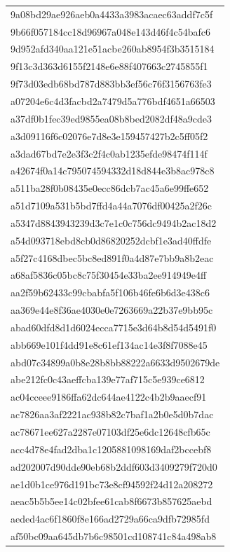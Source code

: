 \begin{tabular}{l}
9a08bd29ae926aeb0a4433a3983acaec63addf7c5f \\
9b66f057184cc18d96967a048e143d46f4c54bafc6 \\
9d952afd340aa121e51acbe260ab8954f3b3515184 \\
9f13c3d363d6155f2148e6e88f407663c2745855f1 \\
9f73d03edb68bd787d883bb3ef56c76f3156763fe3 \\
a07204e6c4d3facbd2a7479d5a776bdf4651a66503 \\
a37df0b1fec39ed9855ea08b8bed2082df48a9cde3 \\
a3d09116f6c02076e7d8e3e159457427b2c5ff05f2 \\
a3dad67bd7e2e3f3c2f4c0ab1235efde98474f114f \\
a42674f0a14c795074594332d18d844e3b8ac978c8 \\
a511ba28f0b08435e0ecc86dcb7ac45a6e99ffe652 \\
a51d7109a531b5bd7ffd4a44a7076df00425a2f26c \\
a5347d8843943239d3c7e1c0c756dc9494b2ac18d2 \\
a54d093718ebd8cb0d86820252dcbf1e3ad40ffdfe \\
a5f27c4168dbec5bc8ed891f0a4d87e7bb9a8b2eac \\
a68af5836c05bc8c75f30454e33ba2ee914949e4ff \\
aa2f59b62433c99cbabfa5f106b46fe6b6d3e438c6 \\
aa369e44e8f36ae4030e0e7263669a22b37e9bb95c \\
abad60dfd8d1d6024ecca7715e3d64b8d54d5491f0 \\
abb669e101f4dd91e8c61ef134ac14e3f8f7088e45 \\
abd07c34899a0b8e28b8bb88222a6633d9502679de \\
abe212fc0c43aeffcba139e77af715c5e939ce6812 \\
ac04cceee9186ffa62dc644ae4122c4b2b9aaecf91 \\
ac7826aa3af2221ac938b82c7baf1a2b0e5d0b7dac \\
ac78671ee627a2287e07103df25e6dc12648cfb65c \\
acc4d78e4fad2dba1c1205881098169daf2bccebf8 \\
ad202007d90dde90eb68b2ddf603d3409279f720d0 \\
ae1d0b1ce976d191bc73e8cf94592f24d12a208272 \\
aeac5b5b5ee14c02bfee61cab8f6673b857625aebd \\
aeded4ac6f1860f8e166ad2729a66ca9dfb72985fd \\
af50bc09aa645db7b6c98501cd108741c84a498ab8 \\

\end{tabular}
